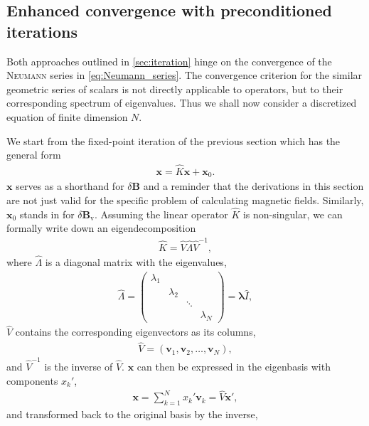 \documentclass[a4paper, twoside, 10pt, english]{article}
\numberwithin{equation}{section}
\let\vec\symbf
\newcommand*\Bvac{\ensuremath{\delta \vec{B}_{\text{v}}}}  %
\newcommand*\Bpert{\ensuremath{\delta \vec{B}}}  %
\begin{document}
\subsection{Enhanced convergence with preconditioned iterations}
\label{sec:Arnoldi}

Both approaches outlined in \cref{sec:iteration} hinge on the convergence of the \textsc{Neumann} series in \cref{eq:Neumann_series}. The convergence criterion for the similar geometric series of scalars is not directly applicable to operators, but to their corresponding spectrum of eigenvalues. Thus we shall now consider a discretized equation of finite dimension $N$.

We start from the fixed-point iteration of the previous section which has the general form
\begin{gather}
  \vec{x} = \hat{K} \vec{x} + \vec{x}_{0}. \label{eq:Arnoldi_fixed_point}
\end{gather}
$\vec{x}$ serves as a shorthand for $\Bpert$ and a reminder that the derivations in this section are not just valid for the specific problem of calculating magnetic fields. Similarly, $\vec{x}_{0}$ stands in for $\Bvac$.  Assuming the linear operator $\hat{K}$ is non-singular, we can formally write down an eigendecomposition
\begin{gather}
  \hat{K} = \hat{V} \hat{\Lambda} \hat{V}^{-1},
\end{gather}
where $\hat{\Lambda}$ is a diagonal matrix with the eigenvalues,
\begin{gather}
  \hat{\Lambda} = \begin{pmatrix}
    \lambda_{1} & & & \\
    & \lambda_{2} & & \\
    & & \ddots & \\
    & & & \lambda_{N}
  \end{pmatrix} = \vec{\lambda} \hat{I},
\end{gather}
$\hat{V}$ contains the corresponding eigenvectors as its columns,
\begin{gather}
  \hat{V} = \left ( \vec{v}_{1}, \vec{v}_{2}, \dotsc, \vec{v}_{N} \right ),
\end{gather}
and $\hat{V}^{-1}$ is the inverse of $\hat{V}$. $\vec{x}$ can then be expressed in the eigenbasis with components $x_{k}'$,
\begin{gather}
  \vec{x} = \sum_{k = 1}^{N} x_{k}' \vec{v}_{k} = \hat{V} \vec{x}',
\end{gather}
and transformed back to the original basis by the inverse,
\end{document}
